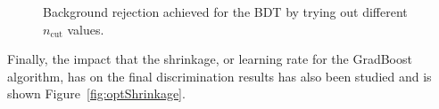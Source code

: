 \documentclass[a4paper, 10pt, openright]{report}
\begin{document}
\begin{appendices}
\begin{figure}[htbp]
{\begin{minipage}[b]{.48\textwidth}
\end{minipage} \hfill
}
\caption{Background rejection achieved for the \ac{BDT} by trying out different $n_{\text{cut}}$ values.}
\label{fig:optCuts}
\end{figure}

Finally, the impact that the shrinkage, or learning rate for the GradBoost algorithm, has on the final discrimination results has also been studied and is shown Figure~\ref{fig:optShrinkage}.  

\begin{figure}[htbp]
\centering
{}
\end{figure}
\end{appendices}
\end{document}

